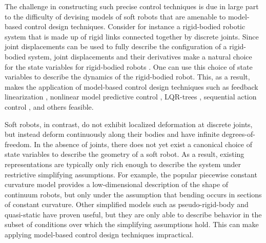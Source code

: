 The challenge in constructing such precise control techniques is due in large part to the difficulty of devising models of soft robots that are amenable to model-based control design techniques.
Consider for instance a rigid-bodied robotic system that is made up of rigid links connected together by discrete joints.
Since joint displacements can be used to fully describe the configuration of a rigid-bodied system, joint displacements and their derivatives make a natural choice for the state variables for rigid-bodied robots \cite{spong2008robot}.
One can use this choice of state variables to describe the dynamics of the rigid-bodied robot.
This, as a result, makes the application of model-based control design techniques such as feedback linearization \cite{spong2008robot}, nonlinear model predictive control \cite{allgower2012nonlinear}, LQR-trees \cite{tedrake2010lqr}, sequential action control \cite{ansari2016sequential}, and others feasible.

Soft robots, in contrast, do not exhibit localized deformation at discrete joints, but instead deform continuously along their bodies and have infinite degrees-of-freedom.
In the absence of joints, there does not yet exist a canonical choice of state variables to describe the geometry of a soft robot.
As a result, existing representations are typically only rich enough to describe the system under restrictive simplifying assumptions.
For example, the popular piecewise constant curvature model \cite{webster2010design} provides a low-dimensional description of the shape of continuum robots, but only under the assumption that bending occurs in sections of constant curvature.
Other simplified models such as pseudo-rigid-body \cite{howell1996evaluation} and quasi-static \cite{bruder2018iros, thuruthel2018model, gravagne2003large, trivedi2008geometrically} have proven useful,
but they are only able to describe behavior in the subset of conditions over which the simplifying assumptions hold.
This can make applying model-based control design techniques impractical. 

